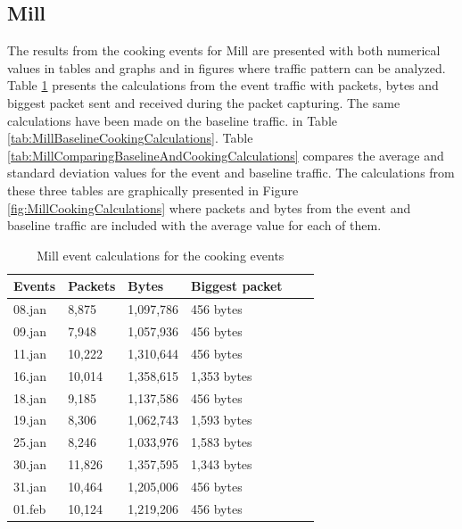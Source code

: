 \newpage
\subsection{Mill}
The results from the cooking events for Mill are presented with both numerical values in tables and graphs and in figures where traffic pattern can be analyzed. Table \ref{tab:MillCookingCalculations} presents the calculations from the event traffic with packets, bytes and biggest packet sent and received during the packet capturing. The same calculations have been made on the baseline traffic. in Table \ref{tab:MillBaselineCookingCalculations}. Table \ref{tab:MillComparingBaselineAndCookingCalculations} compares the average and standard deviation values for the event and baseline traffic. The calculations from these three tables are graphically presented in Figure \ref{fig:MillCookingCalculations} where packets and bytes from the event and baseline traffic are included with the average value for each of them. 

\begin{table}[H]
    \centering
    \caption{Mill event calculations for the cooking events}
    \begin{tabular}{|l|l|l|l|l|l|}
    \hline
        \textbf{Events} & \textbf{Packets} & \textbf{Bytes} & \textbf{Biggest packet} \\ \hline
        08.jan & 8,875  & 1,097,786 & 456 bytes   \\ \hline
        09.jan & 7,948  & 1,057,936 & 456 bytes   \\ \hline
        11.jan & 10,222 & 1,310,644 & 456 bytes   \\ \hline
        16.jan & 10,014 & 1,358,615 & 1,353 bytes \\ \hline
        18.jan & 9,185  & 1,137,586 & 456 bytes   \\ \hline
        19.jan & 8,306  & 1,062,743 & 1,593 bytes \\ \hline
        25.jan & 8,246  & 1,033,976 & 1,583 bytes \\ \hline
        30.jan & 11,826 & 1,357,595 & 1,343 bytes  \\ \hline
        31.jan & 10,464 & 1,205,006 & 456 bytes \\ \hline
        01.feb & 10,124 & 1,219,206 & 456 bytes \\ \hline
    \end{tabular}
    \label{tab:MillCookingCalculations}
\end{table}

